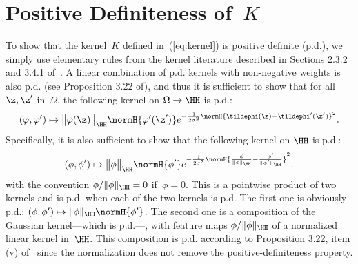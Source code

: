 \section{Positive Definiteness of~$K$}\label{sec:appendixA}
To show that the kernel~$K$ defined in~(\ref{eq:kernel}) is positive definite
(p.d.), we simply use elementary rules from the kernel literature described in
Sections 2.3.2 and 3.4.1 of~\cite{shawe2004}.  A linear combination of p.d. kernels with non-negative weights is also p.d. (see Proposition 3.22
of\cite{shawe2004}), and thus it is sufficient to show that for all $\z,\z'$
in~$\Omega$, the following kernel on $\Omega \to \HH$ is p.d.:
\begin{displaymath}
   (\varphi,\varphi') \mapsto \big\|\varphi(\z)\big\|_\HH  \normH{\varphi'(\z')} e^{-\frac{1}{2\sigma^2} \normH{\tildephi(\z)-\tildephi'(\z')}^2}.
\end{displaymath}
Specifically, it is also sufficient to
show that the following kernel on $\HH$ is p.d.:
\begin{displaymath}
   (\phi,\phi') \mapsto \big\|{\phi}\big\|_\HH  \normH{\phi'} e^{-\frac{1}{2\sigma^2} \normH{\frac{\phi}{\|\phi\|_\HH}-\frac{\phi'}{\|\phi'\|_\HH}}^2}.
\end{displaymath}
with the convention $\phi/\|\phi\|_\HH=0$ if~$\phi=0$.
This is a pointwise product of two kernels and is p.d. when each of the two
kernels is p.d. The first one is obviously p.d.: $(\phi,\phi') \mapsto
\|{\phi}\|_\HH  \normH{\phi'}$. The second one is a composition of the Gaussian
kernel---which is p.d.---, with feature maps $\phi/\|\phi\|_\HH$ of a
normalized linear kernel in~$\HH$.  This composition is p.d. according to
Proposition 3.22, item (v) of~\cite{shawe2004} since the normalization does
not remove the positive-definiteness property.

